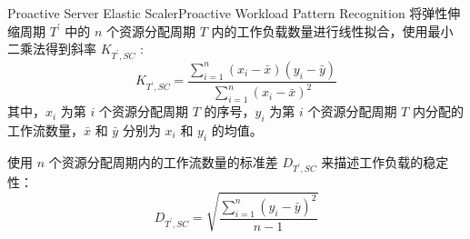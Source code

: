 \documentclass[aspectratio=169]{beamer}
\begin{document}
\begin{frame}{Proactive Server Elastic Scaler}{Proactive Workload Pattern Recognition}
  将弹性伸缩周期 $T^\prime$ 中的 $n$ 个资源分配周期 $T$ 内的工作负载数量进行线性拟合，使用最小二乘法得到斜率 $K_{T^\prime, SC}$ :
  \begin{equation*}
    K_{T^\prime, SC} = \frac{\sum_{i=1}^{n} (x_i - \bar{x})(y_i - \bar{y})}{\sum_{i=1}^{n} (x_i - \bar{x})^2}
  \end{equation*}
  其中，$x_i$ 为第 $i$ 个资源分配周期 $T$ 的序号，$y_i$ 为第 $i$ 个资源分配周期 $T$ 内分配的工作流数量，$\bar{x}$ 和 $\bar{y}$ 分别为 $x_i$ 和 $y_i$ 的均值。

  \hfill\pause

  使用 $n$ 个资源分配周期内的工作流数量的标准差 $D_{T^\prime, SC}$ 来描述工作负载的稳定性：
  \begin{equation*}
    D_{T^\prime, SC} = \sqrt{\frac{\sum_{i=1}^{n} (y_i - \bar{y})^2}{n-1}}
  \end{equation*}
\end{frame}
\end{document}
